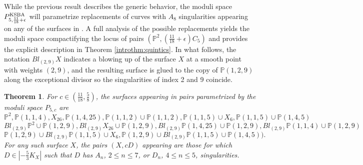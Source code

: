 \documentclass[11pt]{amsart}
\numberwithin{equation}{section}
\newtheorem{theorem}{Theorem}[section]
\theoremstyle{definition}
\newcommand{\KSBA}{{\rm KSBA}}
\newcommand{\bP}{\mathbb{P}}
\begin{document}
While the previous result describes the generic behavior, the moduli space $P^{\KSBA}_{5, \frac{11}{18}+\epsilon}$ will parametrize replacements of curves with $A_8$ singularities appearing on any of the surfaces in \cite[Section 11.2]{hacking}.  A full analysis of the possible replacements yields the moduli space compactifying the locus of pairs $(\bP^2, (\frac{11}{18} + \epsilon)C_5)$ and provides the explicit description in Theorem \ref{introthm:quintics}.  In what follows, the notation $Bl_{(2,9)}X$ indicates a blowing up of the surface $X$ at a smooth point with weights $(2,9)$, and the resulting surface is glued to the copy of $\bP(1,2,9)$ along the exceptional divisor so the singularities of index 2 and 9 coincide.

\begin{theorem}
    For $c \in (\frac{11}{18}, \frac{5}{8})$, the surfaces appearing in pairs parametrized by the moduli space $P_{5,c}$ are 
    \[ \bP^2, \bP(1,1,4), X_{26}, \bP(1,4,25), \bP(1,1,2) \cup \bP(1,1,2), \bP(1,1,5) \cup X_6, \bP(1,1,5) \cup \bP(1,4,5) \]
    \[Bl_{(2,9)} \bP^2 \cup \bP(1,2,9), Bl_{(2,9)} X_{26} \cup \bP(1,2,9), Bl_{(2,9)} \bP(1,4,25) \cup \bP(1,2,9), Bl_{(2,9)} \bP(1,1,4) \cup \bP(1,2,9) \]
    \[ \bP(1,2,9) \cup Bl_{(2,9)} \bP(1,1,5) \cup X_6  , \bP(1,2,9) \cup Bl_{(2,9)} \bP(1,1,5) \cup \bP(1,4,5)).\]
    For any such surface $X$, the pairs $(X,c D)$ appearing are those for which $D \in |-\frac{5}{3} K_X|$ such that $D$ has $A_n$, $2 \le n \le 7$, or $D_n$, $4 \le n \le 5$, singularities. 
\end{theorem}
\end{document}
